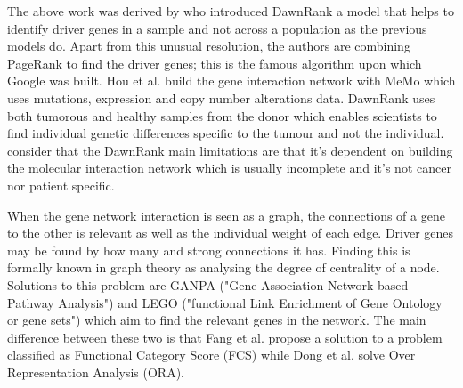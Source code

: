 The above work was derived by \citet{Hou2014-se} who introduced DawnRank a model that helps to identify driver genes in a sample and not across a population as the previous models do. Apart from this unusual resolution, the authors are combining PageRank to find the driver genes; this is the famous algorithm upon which Google was built. Hou et al. build the gene interaction network with MeMo \cite{Ciriello2012-hi} which uses mutations, expression and copy number alterations data. DawnRank uses both tumorous and healthy samples from the donor which enables scientists to find individual genetic differences specific to the tumour and not the individual. \citet{Hou2014-se} consider that the DawnRank main limitations are that it's dependent on building the molecular interaction network which is usually incomplete and it's not cancer nor patient specific. 





When the gene network interaction is seen as a graph, the connections of a gene to the other is relevant as well as the individual weight of each edge.  Driver genes may be found by how many and strong connections it has. Finding this is formally known in graph theory as analysing the degree of centrality of a node. Solutions to this problem are GANPA ("Gene Association Network-based Pathway Analysis")\cite{Fang2012-vr} and LEGO ("functional Link Enrichment of Gene Ontology or gene sets")\cite{Dong2016-zs} which aim to find the relevant genes in the network. The main difference between these two is that Fang et al. propose a solution to a problem classified as Functional Category Score (FCS) while Dong et al. solve Over Representation Analysis (ORA). 

